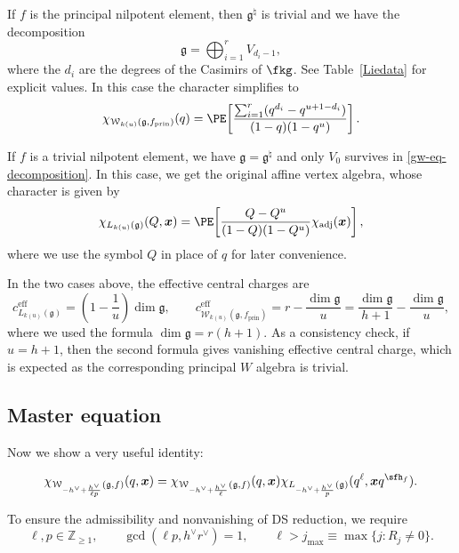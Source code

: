 \documentclass[a4paper,11pt]{article}
\theoremstyle{definition}
\theoremstyle{definition}
\theoremstyle{remark}
\newcommand{\ceff}{c^\text{eff}}
\newcommand{\prin}{ \text{prin}}
\newcommand{\be}{\begin{equation}}
\newcommand{\ee}{\end{equation}}
\begin{document}
If $f$ is    the principal nilpotent element, then $\mathfrak g^\natural$ is trivial and  we have the decomposition 
\be
 \mathfrak g=\bigoplus_{ i=1}^r  V_{d_i-1},
 \ee
 where the $d_i$  are the degrees of the Casimirs of $\fkg$.  See Table~\ref{Liedata} for   explicit values.
  In this case the character simplifies  to
\be \label{chiprin}
 \chi_{\mathcal W_{k(u) }(\mathfrak g,f_\prin)}(q )
 =\PE\!\left[
 \frac{\sum_{i=1}^r (q^{d_i}-q^{u+1-d_i }) }
 {(1-q)(1-q^u)}\right].
\ee
  
 
 

If $f$ is a trivial nilpotent element,  we have $\mathfrak g=\mathfrak g^\natural$ and  only $V_0$ survives in \eqref{gw-eq-decomposition}.  In this case, we get the original affine vertex algebra, whose character is given by
\be  \label{chiaff}
  \chi_{  L_{k(u) }(\mathfrak g )}( Q,\bm x) 
 =\PE\!\left[
 \frac{Q-Q^u}{(1-Q)(1-Q^u)}\chi_{\mathrm{adj}}(\bm x)
 \right],
\ee
 where we use the symbol  $Q$ in place of $q$ for later convenience. 

 
 In the two cases above, the effective central charges are
\be \label{ceffprins}
\ceff_{   L_{k(u) }(\mathfrak g )}
=
\left(1-\frac{1}{ u}\right)\dim\mathfrak g,
\qquad
\ceff_{\mathcal W_{k(u) }(\mathfrak g,f_\prin)}
=
r -\frac{ \dim\mathfrak g}{ u}=
\frac{ \dim\mathfrak g}{ h+1} -\frac{ \dim\mathfrak g}{ u},
\ee
where we used the formula  $\dim\mathfrak g=r(h+1)$.
As a consistency check, if $u=h+1$, then the second formula gives  vanishing effective central charge, which is expected as the corresponding principal $W$ algebra is trivial.

 
 




\subsection{Master equation}
Now we show a very useful identity: 

\be
\chi_{\mathcal W_{-h^\vee+\frac{h^\vee}{ \ell p }}(\mathfrak g,f)}(q,\bm x)
 =\chi_{\mathcal W_{-h^\vee+\frac{h^\vee}{ \ell   }}(\mathfrak g,f)}(q,\bm x) 
 \chi_{L_{-h^\vee+\frac{h^\vee}{ p   }}(\mathfrak g)}(q^\ell,\bm x q^{\sfh_f}).
  \label{usefulEq2}
\ee



 

 



To ensure the    admissibility and nonvanishing  of DS reduction, we require  
\be
 \ell,p\in\mathbb Z_{\geq1},\qquad
 \gcd(\ell p,h^\vee r^\vee)=1,\qquad \ell>j_{\text{max}}\equiv {\max\{j:R_j\neq0\}}.
 \label{gw-eq-ratio-hypotheses}
\ee
 
\end{document}
